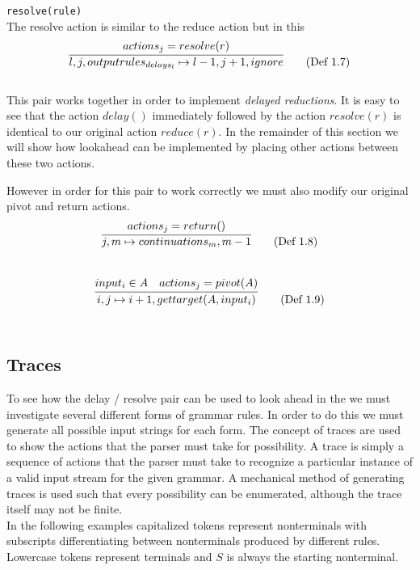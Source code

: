 \documentclass[11pt]{article}
\begin{document}
\texttt{resolve(rule)}\\
The resolve action is similar to the reduce action but in this 
\begin{equation}
\infer{l, j, outputrules_{delays_l} \mapsto l-1, j+1, ignore}{actions_j = resolve(r)} \tag{Def 1.7}
\end{equation}\\

This pair works together in order to implement \emph{delayed reductions}. 
It is easy to see that the action $delay()$ immediately followed by the action $resolve(r)$ is identical to our original action $reduce(r)$. 
In the remainder of this section we will show how lookahead can be implemented by placing other actions between these two actions.

However in order for this pair to work correctly we must also modify our original pivot and return actions.
\begin{equation}
\infer{j, m \mapsto continuations_m, m-1}{actions_j = return()} \tag{Def 1.8}
\end{equation}\\

\begin{equation}
\infer{i, j \mapsto i+1, gettarget(A, input_i)}{input_i \in A & actions_j = pivot(A)} \tag{Def 1.9}
\end{equation}\\


\subsection{Traces}
To see how the delay / resolve pair can be used to look ahead in the we must investigate several different forms of grammar rules.
In order to do this we must generate all possible input strings for each form. 
The concept of traces are used to show the actions that the parser must take for possibility.
A trace is simply a sequence of actions that the parser must take to recognize a particular instance of a valid input stream for the given grammar.
A mechanical method of generating traces is used such that every possibility can be enumerated, although the trace itself may not be finite.\\

In the following examples capitalized tokens represent nonterminals with subscripts differentiating between nonterminals produced by different rules. Lowercase tokens represent terminals and $S$ is always the starting nonterminal.\\
\end{document}
